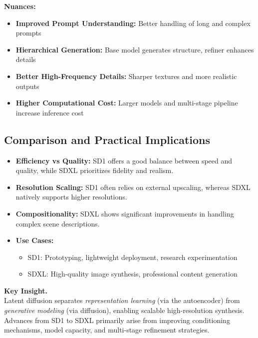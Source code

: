 \vspace{0.5em}
\noindent
\textbf{Nuances:}
\begin{itemize}
    \item \textbf{Improved Prompt Understanding:} Better handling of long and complex prompts
    \item \textbf{Hierarchical Generation:} Base model generates structure, refiner enhances details
    \item \textbf{Better High-Frequency Details:} Sharper textures and more realistic outputs
    \item \textbf{Higher Computational Cost:} Larger models and multi-stage pipeline increase inference cost
\end{itemize}

\subsection{Comparison and Practical Implications}

\begin{itemize}
    \item \textbf{Efficiency vs Quality:}  
    SD1 offers a good balance between speed and quality, while SDXL prioritizes fidelity and realism.

    \item \textbf{Resolution Scaling:}  
    SD1 often relies on external upscaling, whereas SDXL natively supports higher resolutions.

    \item \textbf{Compositionality:}  
    SDXL shows significant improvements in handling complex scene descriptions.

    \item \textbf{Use Cases:}
    \begin{itemize}
        \item SD1: Prototyping, lightweight deployment, research experimentation
        \item SDXL: High-quality image synthesis, professional content generation
    \end{itemize}
\end{itemize}

\vspace{0.5em}
\noindent
\textbf{Key Insight.} \\
Latent diffusion separates \textit{representation learning} (via the autoencoder) from \textit{generative modeling} (via diffusion), enabling scalable high-resolution synthesis. Advances from SD1 to SDXL primarily arise from improving conditioning mechanisms, model capacity, and multi-stage refinement strategies.


